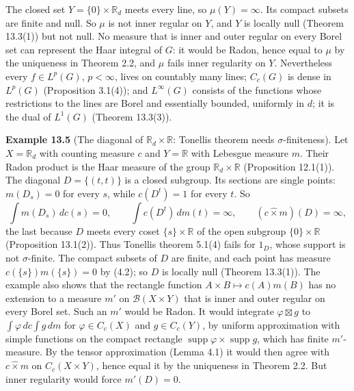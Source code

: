 \documentclass[
  english,
  11pt,
  a4paper,
]{article}
\begin{document}
The closed set \(Y=\{0\}\times\mathbb R_d\) meets every line, so
\(\mu(Y)=\infty\). Its compact subsets are finite and null. So \(\mu\)
is not inner regular on \(Y\), and \(Y\) is locally null (Theorem
13.3(1)) but not null. No measure that is inner and outer regular on
every Borel set can represent the Haar integral of \(G\): it would be
Radon, hence equal to \(\mu\) by the uniqueness in Theorem 2.2, and
\(\mu\) fails inner regularity on \(Y\). Nevertheless every
\(f\in L^p(G)\), \(p<\infty\), lives on countably many lines; \(C_c(G)\)
is dense in \(L^p(G)\) (Proposition 3.1(4)); and \(L^\infty(G)\)
consists of the functions whose restrictions to the lines are Borel and
essentially bounded, uniformly in \(d\); it is the dual of \(L^1(G)\)
(Theorem 13.3(3)).

\textbf{Example 13.5} (The diagonal of \(\mathbb R_d\times\mathbb R\):
Tonelli\textquotesingle s theorem needs \(\sigma\)-finiteness). Let
\(X=\mathbb R_d\) with counting measure \(c\) and \(Y=\mathbb R\) with
Lebesgue measure \(m\). Their Radon product is the Haar measure of the
group \(\mathbb R_d\times\mathbb R\) (Proposition 12.1(1)). The diagonal
\(D=\{(t,t)\}\) is a closed subgroup. Its sections are single points:
\(m(D_s)=0\) for every \(s\), while \(c(D^t)=1\) for every \(t\). So
\[\int m(D_s)\,dc(s)=0,\qquad\int c(D^t)\,dm(t)=\infty,\qquad(c\hat\times m)(D)=\infty,\]
the last because \(D\) meets every coset \(\{s\}\times\mathbb R\) of the
open subgroup \(\{0\}\times\mathbb R\) (Proposition 13.1(2)). Thus
Tonelli\textquotesingle s theorem 5.1(4) fails for \(1_D\), whose
support is not \(\sigma\)-finite. The compact subsets of \(D\) are
finite, and each point has measure \(c(\{s\})m(\{s\})=0\) by (4.2); so
\(D\) is locally null (Theorem 13.3(1)). The example also shows that the
rectangle function \(A\times B\mapsto c(A)m(B)\) has no extension to a
measure \(m'\) on \(\mathcal B(X\times Y)\) that is inner and outer
regular on every Borel set. Such an \(m'\) would be Radon. It would
integrate \(\varphi\boxtimes g\) to \(\int\varphi\,dc\int g\,dm\) for
\(\varphi\in C_c(X)\) and \(g\in C_c(Y)\), by uniform approximation with
simple functions on the compact rectangle
\(\operatorname{supp}\varphi\times\operatorname{supp}g\), which has
finite \(m'\)-measure. By the tensor approximation (Lemma 4.1) it would
then agree with \(c\hat\times m\) on \(C_c(X\times Y)\), hence equal it
by the uniqueness in Theorem 2.2. But inner regularity would force
\(m'(D)=0\).
\end{document}
